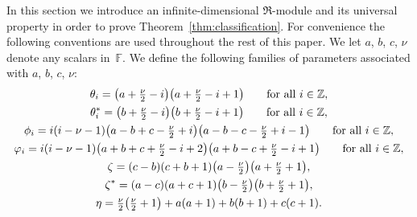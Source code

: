 \documentclass[pdftex]{sigma}
\def\F{\mathbb F}
\def\Z{\mathbb Z}
\numberwithin{equation}{section}
\begin{document}
In this section we introduce an infinite-dimensional $\Re$-module and its universal property in order to prove Theorem~\ref{thm:classification}. For convenience the following conventions are used throughout the rest of this paper. We let $a$, $b$, $c$, $\nu$ denote any scalars in~$\F$. We define the following families of parameters associated with $a$, $b$, $c$, $\nu$:
\begin{gather}
\theta_i =\big(a+\textstyle\frac{\nu}{2}-i\big)\big(a+\textstyle\frac{\nu}{2}-i+1\big)\qquad \hbox{for all $i\in \Z$}, \label{theta_i}\\
\theta^*_i=\big(b+\textstyle\frac{\nu}{2}-i\big)\big(b+\textstyle\frac{\nu}{2}-i+1\big)\qquad\hbox{for all $i\in \Z$}, \label{theta_is}\\
\phi_i=i(i-\nu-1)\big(a-b+c-\textstyle\frac{\nu}{2}+i\big)\big(a-b-c-\textstyle\frac{\nu}{2}+i-1\big)\qquad
\hbox{for all $i\in \Z$},\label{phi_i}\\
\varphi_i=i(i-\nu-1)\big(a+b+c+\textstyle\frac{\nu}{2}-i+2\big)\big(a+b-c+\textstyle\frac{\nu}{2}-i+1\big)
\qquad\hbox{for all $i\in \Z$},\label{varphi_i}\\
\zeta=(c-b)(c+b+1)\big(a-\textstyle\frac{\nu}{2}\big)\big(a+\textstyle\frac{\nu}{2}+1\big),\label{omega}\\
\zeta^*=(a-c)(a+c+1)\big(b-\textstyle\frac{\nu}{2}\big)\big(b+\textstyle\frac{\nu}{2}+1\big),\label{omages}\\
\eta=\textstyle\frac{\nu}{2} \big(\textstyle\frac{\nu}{2}+1\big)+a(a+1)+b(b+1)+c(c+1).\label{eta}
\end{gather}
\end{document}
